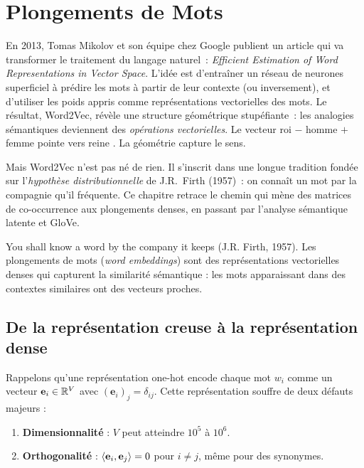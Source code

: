 \chapter{Plongements de Mots}
\label{ch:plongements}

En 2013, Tomas Mikolov et son \'equipe chez Google publient un article qui va transformer le traitement du langage naturel~: \emph{Efficient Estimation of Word Representations in Vector Space}. L'id\'ee est d'entra\^iner un r\'eseau de neurones superficiel \`a pr\'edire les mots \`a partir de leur contexte (ou inversement), et d'utiliser les poids appris comme repr\'esentations vectorielles des mots. Le r\'esultat, Word2Vec, r\'ev\`ele une structure g\'eom\'etrique stupéfiante~: les analogies s\'emantiques deviennent des \emph{op\'erations vectorielles}. Le vecteur \og roi \fg $-$ \og homme \fg $+$ \og femme \fg pointe vers \og reine \fg. La g\'eom\'etrie capture le sens.

Mais Word2Vec n'est pas n\'e de rien. Il s'inscrit dans une longue tradition fond\'ee sur l'\emph{hypoth\`ese distributionnelle} de J.R.~Firth (1957)~: \og on conna\^it un mot par la compagnie qu'il fr\'equente. \fg Ce chapitre retrace le chemin qui m\`ene des matrices de co-occurrence aux plongements denses, en passant par l'analyse s\'emantique latente et GloVe.

\begin{intuition}[title=\textbf{L'hypoth\`ese distributionnelle}]
\og You shall know a word by the company it keeps \fg (J.R. Firth, 1957).
Les plongements de mots (\emph{word embeddings}) sont des repr\'esentations
vectorielles denses qui capturent la similarit\'e s\'emantique : les mots
apparaissant dans des contextes similaires ont des vecteurs proches.
\end{intuition}

\section{De la repr\'esentation creuse \`a la repr\'esentation dense}
\label{sec:plg:motivation}

Rappelons qu'une repr\'esentation one-hot encode chaque mot $w_i$ comme un
vecteur $\mathbf{e}_i \in \mathbb{R}^V$ avec $(\mathbf{e}_i)_j = \delta_{ij}$.
Cette repr\'esentation souffre de deux d\'efauts majeurs :
\begin{enumerate}
    \item \textbf{Dimensionnalit\'e} : $V$ peut atteindre $10^5$ \`a $10^6$.
    \item \textbf{Orthogonalit\'e} : $\langle \mathbf{e}_i, \mathbf{e}_j \rangle = 0$
          pour $i \neq j$, m\^eme pour des synonymes.
\end{enumerate}

